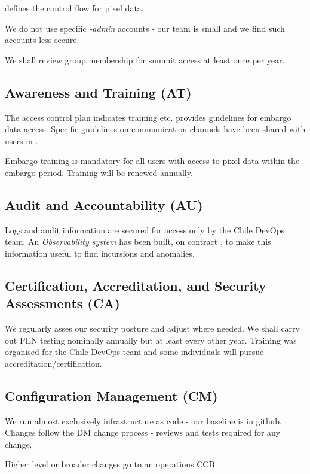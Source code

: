  defines the control flow for pixel data.

We do not use specific \emph{-admin} accounts  - our team is small and we find such accounts less secure.

We shall review group membership for summit access at least once per year.

\subsection{Awareness and Training (AT)} \label{sec:AT}

The access control plan \citep{ACP} indicates training etc.
 provides guidelines for embargo data access.
Specific guidelines on communication channels have been shared with users in .

Embargo training is mandatory for all users with access to pixel data within the embargo period.
Training will be renewed annually.

\subsection{Audit and Accountability (AU)} \label{sec:AU}
Logs and audit information are secured for access only by the Chile DevOps team.
An \emph{Observability system} has been built, on contract , to make this information useful to find incursions and anomalies.

\subsection{Certification, Accreditation, and Security Assessments (CA)} \label{sec:CA}
We regularly asses our security posture and adjust where needed.
We shall carry out PEN testing nominally annually but at least every other year.
Training was organised for the Chile DevOps team and some individuals will pursue accreditation/certification.

\subsection{Configuration Management (CM)} \label{sec:CM}
We run almost exclusively infrastructure as code - our baseline is in github.
Changes follow the DM change process - reviews and tests required for any change.

Higher level or broader changes go to an operations CCB 

